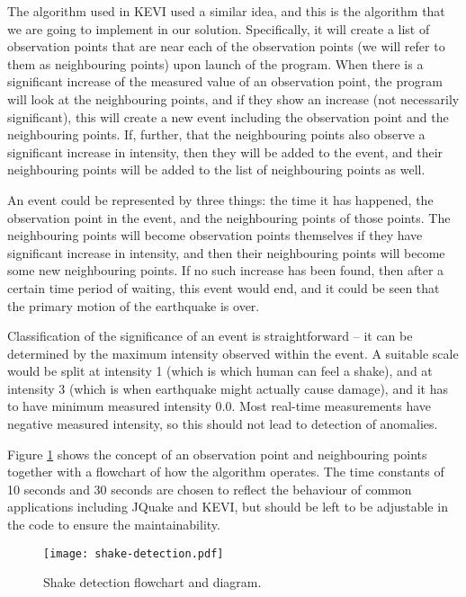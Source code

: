 The algorithm used in KEVI used a similar idea, and this is the algorithm that we are going to implement in our solution. Specifically, it will create a list of observation points that are near each of the observation points (we will refer to them as neighbouring points) upon launch of the program. When there is a significant increase of the measured value of an observation point, the program will look at the neighbouring points, and if they show an increase (not necessarily significant), this will create a new event including the observation point and the neighbouring points. If, further, that the neighbouring points also observe a significant increase in intensity, then they will be added to the event, and their neighbouring points will be added to the list of neighbouring points as well.

An event could be represented by three things: the time it has happened, the observation point in the event, and the neighbouring points of those points. The neighbouring points will become observation points themselves if they have significant increase in intensity, and then their neighbouring points will become some new neighbouring points. If no such increase has been found, then after a certain time period of waiting, this event would end, and it could be seen that the primary motion of the earthquake is over.

Classification of the significance of an event is straightforward -- it can be determined by the maximum intensity observed within the event. A suitable scale would be split at intensity 1 (which is which human can feel a shake), and at intensity 3 (which is when earthquake might actually cause damage), and it has to have minimum measured intensity 0.0. Most real-time measurements have negative measured intensity, so this should not lead to detection of anomalies.

Figure \ref{fig:shake-detection-diag} shows the concept of an observation point and neighbouring points together with a flowchart of how the algorithm operates. The time constants of 10 seconds and 30 seconds are chosen to reflect the behaviour of common applications including JQuake and KEVI, but should be left to be adjustable in the code to ensure the maintainability.

\begin{figure}[!ht]
    \centering
    \texttt{[image: shake-detection.pdf]}
    \caption{Shake detection flowchart and diagram.}
    \label{fig:shake-detection-diag}
\end{figure}

